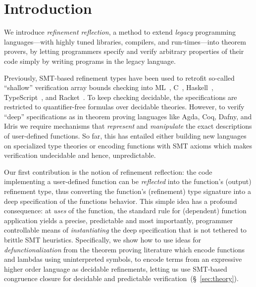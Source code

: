 \section{Introduction}\label{sec:intro}




We introduce \emph{refinement reflection}, a method
to extend \emph{legacy} programming languages---with highly tuned
libraries, compilers, and run-times---into theorem provers,
by letting programmers specify and verify
arbitrary properties of their code simply
by writing programs in the legacy language.

Previously, SMT-based refinement types
\citep{ConstableS87,Rushby98} have been
used to retrofit so-called ``shallow''
verification \eg array bounds checking into
%
ML~\cite{pfenningxi98,GordonRefinement09,LiquidPLDI08},
%
C~\cite{deputy,LiquidPOPL10},
%
Haskell~\citep{Vazou14},
%
TypeScript~\cite{Vekris16}, and
%
Racket~\cite{RefinedRacket}.
%
%
To keep checking decidable, the specifications
are restricted to quantifier-free formulas over
decidable theories.
%
However, to verify ``deep'' specifications as
in theorem proving languages like Agda, Coq, Dafny,
\fstar and Idris we require mechanisms that
\emph{represent} and \emph{manipulate} the
exact descriptions of user-defined functions.
%
So far, this has entailed either building new
languages on specialized type theories or
encoding functions with SMT axioms which makes
verification undecidable and hence, unpredictable.

%
%
Our first contribution is the notion of
refinement reflection: the code
implementing a user-defined function can
be \emph{reflected} into the function's
(output) refinement type, thus converting
the function's (refinement) type signature
into a deep specification of the functions
behavior.
%
This simple idea has a profound consequence:
at \emph{uses} of the function, the standard
rule for (dependent) function application
yields a precise, predictable and most
importantly, programmer controllable
means of \emph{instantiating} the deep
specification that is not tethered to
brittle SMT heuristics.
%
Specifically, we show how to use ideas for
\emph{defunctionalization} from the theorem
proving literature which encode functions
and lambdas using uninterpreted symbols,
to encode terms from an expressive higher
order language as decidable refinements,
letting us use SMT-based congruence
closure for decidable and predictable
verification~(\S~\ref{sec:theory}).

